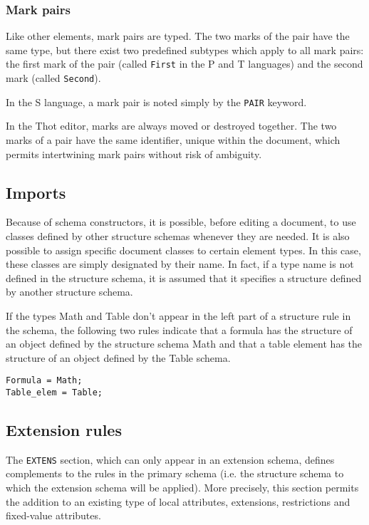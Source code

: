 \subsubsection{Mark pairs}
\label{paires}

Like other elements, mark pairs are typed.  The two marks of the pair
have the same type, but there exist two predefined subtypes which
apply to all mark pairs: the first mark of the pair (called {\tt First}
in the P and T languages) and the second mark (called {\tt Second}). 

In the S language, a mark pair is noted simply by the {\tt PAIR}
keyword.

In the Thot editor, marks are always moved or destroyed together.  The
two marks of a pair have the same identifier, unique within the
document, which permits intertwining mark pairs without risk of
ambiguity.

\subsection{Imports}

Because of schema constructors, it is possible, before editing a
document, to use classes defined by other structure schemas whenever
they are needed.  It is also possible to assign specific document
classes to certain element types.  In this case, these classes are
simply designated by their name.  In fact, if a type name is not
defined in the structure schema, it is assumed that it specifies a
structure defined by another structure schema.

\begin{example}

If the types Math and Table don't appear in the left part
of a structure rule in the schema, the following two rules indicate
that a formula has the structure of an object defined by the structure
schema Math and that a table element has the structure of an
object defined by the Table schema.

\begin{verbatim}
Formula = Math;
Table_elem = Table;
\end{verbatim}
\end{example}

\subsection{Extension rules}

The {\tt EXTENS} section, which can only appear in an extension
schema, defines complements to the rules in the primary schema (i.e.
the structure schema to which the extension schema will be applied).
More precisely, this section permits the addition to an existing type
of local attributes, extensions, restrictions and fixed-value
attributes.

